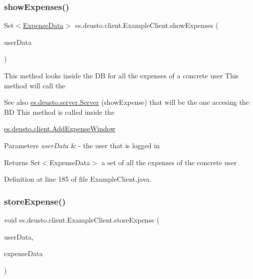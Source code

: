\subsubsection{\texorpdfstring{show\+Expenses()}{showExpenses()}}
{\footnotesize\ttfamily Set$<$\hyperlink{classes_1_1deusto_1_1serialization_1_1_expense_data}{Expense\+Data}$>$ es.\+deusto.\+client.\+Example\+Client.\+show\+Expenses (\begin{DoxyParamCaption}\item[{\hyperlink{classes_1_1deusto_1_1serialization_1_1_user_data}{User\+Data}}]{user\+Data }\end{DoxyParamCaption})}

This method looks inside the DB for all the expenses of a concrete user This method will call the \begin{DoxySeeAlso}{See also}
\hyperlink{classes_1_1deusto_1_1server_1_1_server}{es.\+deusto.\+server.\+Server} (show\+Expense) that will be the one accesing the BD This method is called inside the 

\hyperlink{classes_1_1deusto_1_1client_1_1_add_expense_window}{es.\+deusto.\+client.\+Add\+Expense\+Window} 
\end{DoxySeeAlso}

\begin{DoxyParams}{Parameters}
{\em user\+Data} & -\/ the user that is logged in \\
\hline
\end{DoxyParams}
\begin{DoxyReturn}{Returns}
Set$<$\+Expense\+Data$>$ a set of all the expenses of the concrete user 
\end{DoxyReturn}


Definition at line 185 of file Example\+Client.\+java.

\mbox{\label{classes_1_1deusto_1_1client_1_1_example_client_aba5fe3dfb882ef22d0bd49b5915871d3}} 
\subsubsection{\texorpdfstring{store\+Expense()}{storeExpense()}}
{\footnotesize\ttfamily void es.\+deusto.\+client.\+Example\+Client.\+store\+Expense (\begin{DoxyParamCaption}\item[{\hyperlink{classes_1_1deusto_1_1serialization_1_1_user_data}{User\+Data}}]{user\+Data,  }\item[{\hyperlink{classes_1_1deusto_1_1serialization_1_1_expense_data}{Expense\+Data}}]{expense\+Data }\end{DoxyParamCaption})}

